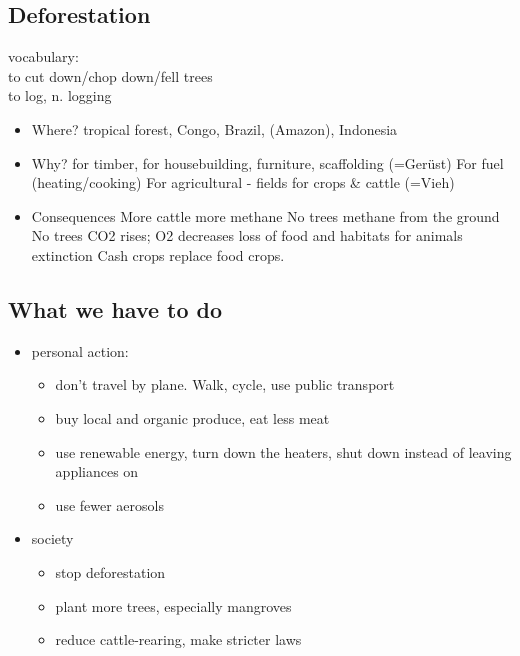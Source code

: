 \documentclass[a5paper,12pt,twoside,titlepage]{scrartcl}
\begin{document}
		
\subsection{Deforestation}
		vocabulary:\\ to cut down/chop down/fell trees\\to log, n. logging 
		\begin{itemize}
		\item Where?
		\subitem tropical forest, Congo, Brazil, (Amazon), Indonesia
		\item Why? 
		\subitem for timber, for housebuilding, furniture, scaffolding (=Gerüst)
		\subitem For fuel (heating/cooking)
		\subitem For agricultural - fields for crops \& cattle (=Vieh)
		\item Consequences
		\subitem More cattle \textrightarrow more methane
		\subitem No trees \textrightarrow methane from the ground
		\subitem No trees \textrightarrow CO2 rises; O2 decreases
		\subitem \textrightarrow loss of food and habitats for animals 
		\subitem \textrightarrow extinction
		\subitem Cash crops replace food crops. 
		\end{itemize}
\subsection{What we have to do}
\begin{itemize}
	\item personal action:
	\begin{itemize}
		\item don't travel by plane. Walk, cycle, use public transport
		\item buy local and organic produce, eat less meat
		\item use renewable energy, turn down the heaters, shut down instead of leaving appliances on
		\item use fewer aerosols
	\end{itemize}
	\item society
	\begin{itemize}
		\item stop deforestation
		\item plant more trees, especially mangroves 
		\item reduce cattle-rearing, make stricter laws
	\end{itemize}	
\end{itemize}
	
\end{document}
